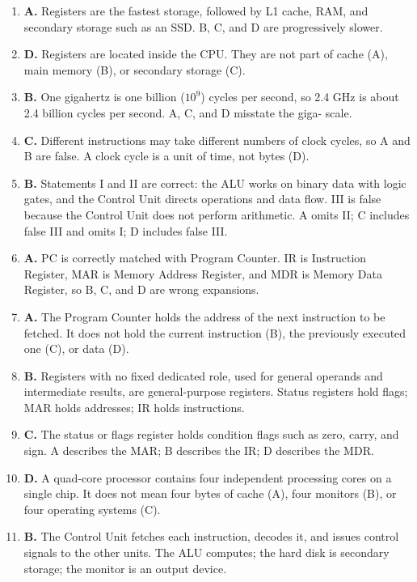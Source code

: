 \documentclass[11pt]{article}
\begin{document}
\begin{enumerate}[label=\textbf{Q\arabic*.}, leftmargin=*]
\item \textbf{A.} Registers are the fastest storage, followed by L1 cache,
  RAM, and secondary storage such as an SSD. B, C, and D are progressively
  slower.
\item \textbf{D.} Registers are located inside the CPU. They are not part of
  cache (A), main memory (B), or secondary storage (C).
\item \textbf{B.} One gigahertz is one billion ($10^9$) cycles per second, so
  2.4 GHz is about 2.4 billion cycles per second. A, C, and D misstate the
  giga- scale.
\item \textbf{C.} Different instructions may take different numbers of clock
  cycles, so A and B are false. A clock cycle is a unit of time, not bytes
  (D).
\item \textbf{B.} Statements I and II are correct: the ALU works on binary
  data with logic gates, and the Control Unit directs operations and data
  flow. III is false because the Control Unit does not perform arithmetic.
  A omits II; C includes false III and omits I; D includes false III.
\item \textbf{A.} PC is correctly matched with Program Counter. IR is
  Instruction Register, MAR is Memory Address Register, and MDR is Memory
  Data Register, so B, C, and D are wrong expansions.
\item \textbf{A.} The Program Counter holds the address of the next
  instruction to be fetched. It does not hold the current instruction (B),
  the previously executed one (C), or data (D).
\item \textbf{B.} Registers with no fixed dedicated role, used for general
  operands and intermediate results, are general-purpose registers. Status
  registers hold flags; MAR holds addresses; IR holds instructions.
\item \textbf{C.} The status or flags register holds condition flags such as
  zero, carry, and sign. A describes the MAR; B describes the IR; D
  describes the MDR.
\item \textbf{D.} A quad-core processor contains four independent processing
  cores on a single chip. It does not mean four bytes of cache (A), four
  monitors (B), or four operating systems (C).
\item \textbf{B.} The Control Unit fetches each instruction, decodes it, and
  issues control signals to the other units. The ALU computes; the hard disk
  is secondary storage; the monitor is an output device.


\end{enumerate}
\end{document}

